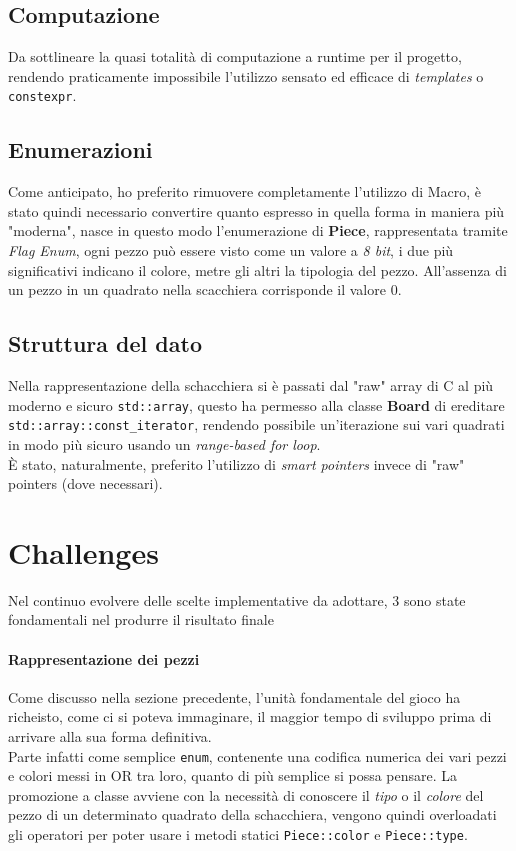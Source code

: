 \documentclass{article}
\begin{document}
        \subsection{Computazione}\label{subsec:computation}
            Da sottlineare la quasi totalità di computazione a runtime per il progetto, rendendo praticamente impossibile l'utilizzo sensato ed efficace di \textit{templates} o \texttt{constexpr}.
        \subsection{Enumerazioni}\label{subsec:enum}
            Come anticipato, ho preferito rimuovere completamente l'utilizzo di Macro, è stato quindi necessario convertire quanto espresso in quella forma in maniera più "moderna", nasce in questo modo l'enumerazione di \textbf{Piece}, rappresentata tramite \textit{Flag Enum}, ogni pezzo può essere visto come un valore a \textit{8 bit}, i due più significativi indicano il colore, metre gli altri la tipologia del pezzo.
            All'assenza di un pezzo in un quadrato nella scacchiera corrisponde il valore 0.
        \subsection{Struttura del dato}\label{subsec:datastruct}
            Nella rappresentazione della schacchiera si è passati dal "raw" array di C al più moderno e sicuro \texttt{std::array}, questo ha permesso alla classe \textbf{Board} di ereditare \texttt{std::array::const\_iterator}, rendendo possibile un'iterazione sui vari quadrati in modo più sicuro usando un \textit{range-based for loop}.\\
            È stato, naturalmente, preferito l'utilizzo di \textit{smart pointers} invece di "raw" pointers (dove necessari).
    \newpage
    \section{Challenges}\label{sec:challenges}
        Nel continuo evolvere delle scelte implementative da adottare, 3 sono state fondamentali nel produrre il risultato finale
        \paragraph{Rappresentazione dei pezzi}
            Come discusso nella sezione precedente, l'unità fondamentale del gioco ha richeisto, come ci si poteva immaginare, il maggior tempo di sviluppo prima di arrivare alla sua forma definitiva.\\
            Parte infatti come semplice \texttt{enum}, contenente una codifica numerica dei vari pezzi e colori messi in OR tra loro, quanto di più semplice si possa pensare. La promozione a classe avviene con la necessità di conoscere il \textit{tipo} o il \textit{colore} del pezzo di un determinato quadrato della schacchiera, vengono quindi overloadati gli operatori per poter usare i metodi statici \texttt{Piece::color} e \texttt{Piece::type}.
\end{document}
